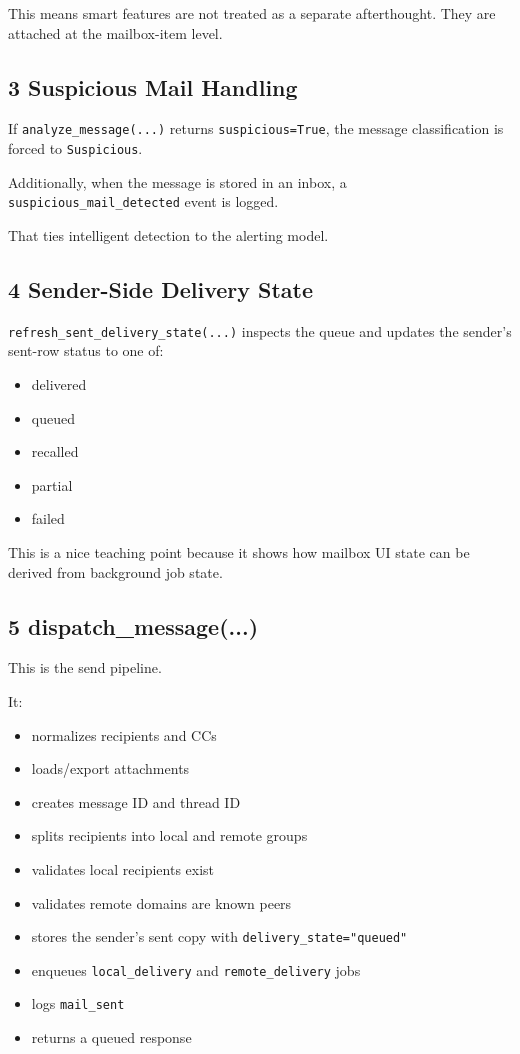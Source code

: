 \documentclass[11pt,a4paper]{article}
\begin{document}
This means smart features are not treated as a separate afterthought. They are attached at the mailbox-item level.

\subsection{3 Suspicious Mail Handling}

If \nolinkurl{analyze_message(...)} returns \nolinkurl{suspicious=True}, the message classification is forced to \nolinkurl{Suspicious}.

Additionally, when the message is stored in an inbox, a \nolinkurl{suspicious_mail_detected} event is logged.

That ties intelligent detection to the alerting model.

\subsection{4 Sender-Side Delivery State}

\nolinkurl{refresh_sent_delivery_state(...)} inspects the queue and updates the sender's sent-row status to one of:

\begin{itemize}
\item delivered
\item queued
\item recalled
\item partial
\item failed
\end{itemize}

This is a nice teaching point because it shows how mailbox UI state can be derived from background job state.

\subsection{5 dispatch\_message(...)}

This is the send pipeline.

It:

\begin{itemize}
\item normalizes recipients and CCs
\item loads/export attachments
\item creates message ID and thread ID
\item splits recipients into local and remote groups
\item validates local recipients exist
\item validates remote domains are known peers
\item stores the sender's sent copy with \nolinkurl{delivery_state="queued"}
\item enqueues \nolinkurl{local_delivery} and \nolinkurl{remote_delivery} jobs
\item logs \nolinkurl{mail_sent}
\item returns a queued response
\end{itemize}
\end{document}
